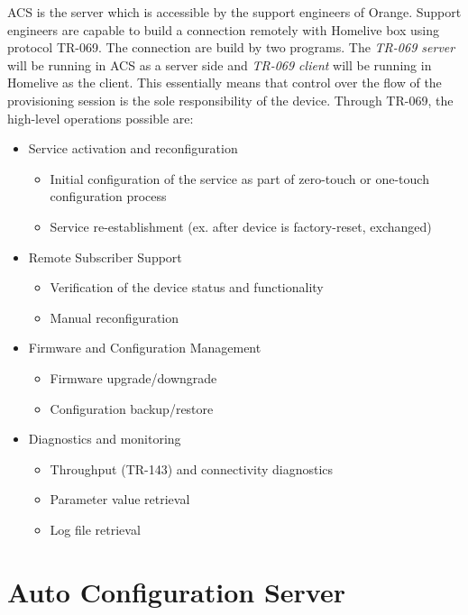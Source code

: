 ACS is the server which is accessible by the support engineers of Orange. Support engineers are capable to build a connection remotely with Homelive box using protocol TR-069. The connection are build by two programs. The \textit{TR-069 server} will be running in ACS as a server side and \textit{TR-069 client} will be running in Homelive as the client. This essentially means that control over the flow of the provisioning session is the sole responsibility of the device. Through TR-069, the high-level operations possible are:
\begin{itemize}
  \item Service activation and reconfiguration
  \begin{itemize}
    \item Initial configuration of the service as part of zero-touch or one-touch configuration process
    \item Service re-establishment (ex. after device is factory-reset, exchanged)
  \end{itemize}
  \item Remote Subscriber Support
  \begin{itemize}
    \item Verification of the device status and functionality
    \item Manual reconfiguration
  \end{itemize}
  \item Firmware and Configuration Management
  \begin{itemize}
    \item Firmware upgrade/downgrade
    \item Configuration backup/restore
  \end{itemize}
  \item Diagnostics and monitoring
  \begin{itemize}
    \item Throughput (TR-143) and connectivity diagnostics
    \item Parameter value retrieval
    \item Log file retrieval
  \end{itemize}
\end{itemize}
\section{Auto Configuration Server}
